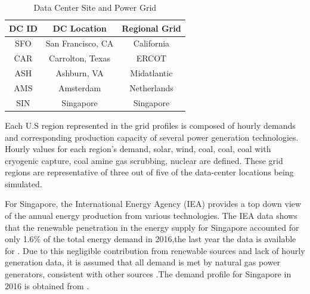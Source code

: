 \begin{table}[ht]
  \vspace{-10 pt}
  \caption{Data Center Site and Power Grid}
  \label{table:tab02}
  \centering
  \begin{tabular}{| c | c | c |  }
    \hline
    \bf{DC ID} & \bf{DC Location} & \bf{Regional Grid} \\
    \hline
    SFO & San Francisco, CA & California \\
    \hline
    CAR & Carrolton, Texas & ERCOT \\
    \hline
    ASH & Ashburn, VA & Midatlantic \\
    \hline
    AMS & Amsterdam & Netherlands \\
    \hline
    SIN & Singapore & Singapore \\
    \hline
  \end{tabular}
  \vspace{-10 pt}   %
  \end{table}

  Each U.S region represented in the grid profiles is composed of hourly demands and corresponding production capacity of several power generation technologies. Hourly values for each region’s demand, solar, wind, coal, coal, coal with cryogenic capture, coal amine gas scrubbing, nuclear are defined. These grid regions are representative of three out of five of the data-center locations being simulated. 
  
  For Singapore, the International Energy Agency (IEA) provides a top down view of the annual energy production from various technologies. The IEA data shows that the renewable penetration in the energy supply for Singapore accounted for only 1.6\% of the total energy demand in 2016,the last year the data is available for \cite{IEA17}. Due to this negligible contribution from renewable sources and lack of hourly generation data, it is assumed that all demand is met by natural gas power generators, consistent with other sources \cite{eia20}.The demand profile for Singapore in 2016 is obtained from \cite{sin16}.

